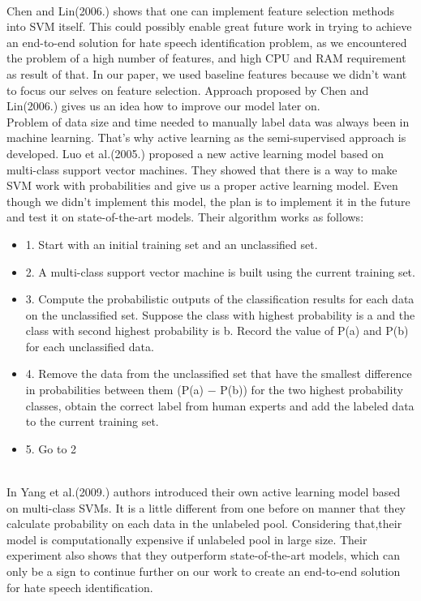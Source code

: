 \documentclass[10pt, a4paper]{article}
\begin{document}
\\Chen and Lin(2006.) shows that one can implement feature selection methods into SVM itself\cite{ChenSVMFeatures}. This could possibly enable great future work in trying to achieve an end-to-end solution for hate speech identification problem, as we encountered the problem of a high number of features, and high CPU and RAM requirement as result of that. In our paper, we used baseline features because we didn't want to focus our selves on feature selection. Approach proposed by Chen and Lin(2006.) gives us an idea how to improve our model later on.
\\Problem of data size and time needed to manually label data was always been in machine learning. That's why active learning as the semi-supervised approach is developed. Luo et al.(2005.) proposed a new active learning model based on multi-class support vector machines. They showed that there is a way to make SVM work with probabilities and give us a proper active learning model. Even though we didn't implement this model, the plan is to implement it in the future and test it on state-of-the-art models. Their algorithm works as follows\cite{LuoALPlankton}:
\begin{itemize}
	\item 1. Start with an initial training set and an unclassified set.
	\item 2. A multi-class support vector machine is built using the current training set.
	\item 3. Compute the probabilistic outputs of the classification results for each data on the unclassified set. Suppose the class with highest probability is a and the class with second highest probability is b. Record the value of P(a) and P(b) for each unclassified data.
	\item 4. Remove the data from the unclassified set that have the smallest difference in probabilities between them (P(a) − P(b)) for the two highest probability classes, obtain the correct label from human experts and add the labeled data to the current training set.
	\item 5. Go to 2
\end{itemize}
\\In Yang et al.(2009.) authors introduced their own active learning model based on multi-class SVMs. It is a little different from one before on manner that they calculate probability on each data in the unlabeled pool. Considering that,their model is computationally expensive if unlabeled pool in large size\cite{YangMultiClassAL}. Their experiment also shows that they outperform state-of-the-art models, which can only be a sign to continue further on our work to create an end-to-end solution for hate speech identification.
\end{document}
